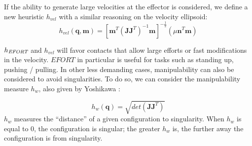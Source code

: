 If the ability to generate large velocities at the effector is considered, we define a new heuristic $h_{vel}$ with a similar reasoning on the velocity ellipsoid:
\begin{equation}
h_{vel}(\mathbf{q}, \mathbf{m}) = [\mathbf{m}^{T}(\mathbf{J}\mathbf{J}^T)^{-1}\mathbf{m}]^{-\frac{1}{2}} ( \mu \mathbf{n}^T \mathbf{m})
\end{equation}

$h_{\textrm{\it EFORT}}$ and $h_{vel}$ will favor contacts that allow large efforts or fast modifications in the velocity.
$EFORT$ in particular is useful for tasks such as standing up, pushing / pulling.
In other less demanding cases, manipulability can also be considered to avoid singularities.
To do so, we can consider the manipulability measure $h_{w}$, also given by Yoshikawa \citeauthor{Yoshikawa1984}:

\begin{equation} \label{ellipsoid}
h_{w}(\mathbf{q}) = \sqrt{det(\mathbf{J}\mathbf{J}^T)}
\end{equation}
$h_{w}$ measures the ``distance'' of a given configuration to singularity. When $h_{w}$ is equal to 0, the configuration is singular;
the greater $h_{w}$ is, the further away the configuration is from singularity.










